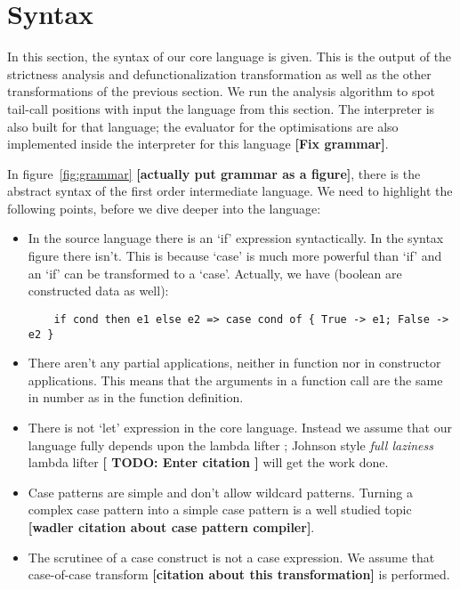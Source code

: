 \documentclass[diploma]{softlab-thesis}
\begin{document}
\section {Syntax}
In this section, the syntax of our core language is given.
This is the output of the strictness analysis and 
defunctionalization transformation as well as the other transformations of the previous 
section. We run the analysis algorithm to spot tail-call positions with input 
the language from this section. The interpreter is also built for that language; the evaluator for 
the optimisations are also implemented inside the interpreter for this language \textbf{[Fix grammar]}.
\newline
\par In figure~\ref{fig:grammar} \textbf{[actually put grammar as a figure]}, there is the abstract syntax of 
the first order intermediate language.
We need to highlight the following points, before we dive deeper into the language:
\begin{itemize}
  \item In the source language there is an `if' expression syntactically. In the syntax figure there isn't.
  This is because `case' is much more powerful than `if' and an `if' can be transformed to a `case'. 
  Actually, we have (boolean are constructed data as well):
  \begin{verbatim}
    if cond then e1 else e2 => case cond of { True -> e1; False -> e2 }
  \end{verbatim}
  \item There aren't any partial applications, neither in function nor in constructor applications.
  This means that the arguments in a function call are the same in number as in the function definition.
  \item There is not `let' expression in the core language. Instead we assume that our language 
  fully depends upon the lambda lifter ; Johnson style \textit{full laziness} lambda lifter \textbf{[ TODO: Enter citation ]} 
  will get the work done.
  \item Case patterns are simple and don't allow wildcard patterns. Turning a complex case pattern into
  a simple case pattern is a well studied topic \textbf{[wadler citation about case pattern compiler]}.
  \item The scrutinee of a case construct is not a case expression. We assume that case-of-case transform 
  \textbf{[citation about this transformation]} is performed.
\end{itemize}
\end{document}
